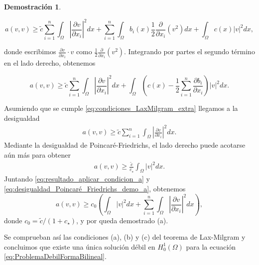 \documentclass[a4paper,11pt,spanish, twoside, leqno]{tfg-uam}
\theoremstyle{definition}
\newtheorem{dem}[teor]{Demostración}
\begin{document}
\begin{dem}
\begin{itemize}
        \begin{equation*}
        a(v, v) \geq \tilde{c} \sum_{i=1}^n \int_\Omega \left| \frac{\partial v}{\partial x_i} \right|^2 dx
        + \sum_{i=1}^n \int_\Omega b_i(x) \frac{1}{2} \frac{\partial}{\partial x_i} (v^2) dx
        + \int_\Omega c(x) |v|^2 dx,
        \end{equation*}

        donde escribimos $\frac{\partial v}{\partial x_i} \cdot v$ como $\frac{1}{2} \frac{\partial}{\partial x_i}(v^2)$. Integrando por partes el segundo término en el lado derecho, obtenemos

        \begin{equation*}
        a(v, v) \geq \tilde{c} \sum_{i=1}^n \int_\Omega \left| \frac{\partial v}{\partial x_i} \right|^2 dx
        + \int_\Omega \left( c(x) - \frac{1}{2} \sum_{i=1}^n \frac{\partial b_i}{\partial x_i} \right) |v|^2 dx.
        \end{equation*}

        Asumiendo que se cumple \eqref{eq:condiciones_LaxMilgram_extra} llegamos a la desigualdad 
        \begin{align}\label{eq:resultado_aplicar_condicion_a}
        a(v, v) \geq  \tilde{c} \sum_{i=1}^{n} \int_{\Omega} \left| \frac{\partial v}{\partial x_i} \right|^2 dx.
        \end{align}
        Mediante la desigualdad de Poincaré-Friedrichs, el lado derecho puede acotarse aún más para obtener
        \begin{align}\label{eq:desigualdad_Poincaré_Friedrichs_demo_a}
        a(v, v) \geq \frac{\tilde{c}}{c_{\star}} \int_{\Omega} |v|^2 dx.
        \end{align}
        Juntando \eqref{eq:resultado_aplicar_condicion_a} y \eqref{eq:desigualdad_Poincaré_Friedrichs_demo_a}, obtenemos
        \begin{equation}\label{eq:desigualdad_final_demo_a}
        a(v, v) \geq c_0 \left( \int_{\Omega} |v|^2 dx + \sum_{i=1}^{n} \int_{\Omega} \left| \frac{\partial v}{\partial x_i} \right|^2 dx \right),
        \end{equation}
        donde $c_0 = \tilde{c}/(1 + c_{\star})$, y por queda demostrado (a).
    \end{itemize}
    Se comprueban así las condiciones (a), (b) y (c) del teorema de Lax-Milgram y concluimos que existe una única solución débil en $H^1_0(\Omega)$ para la ecuación \eqref{eq:ProblemaDebilFormaBilineal}.
\end{dem}
\end{document}
